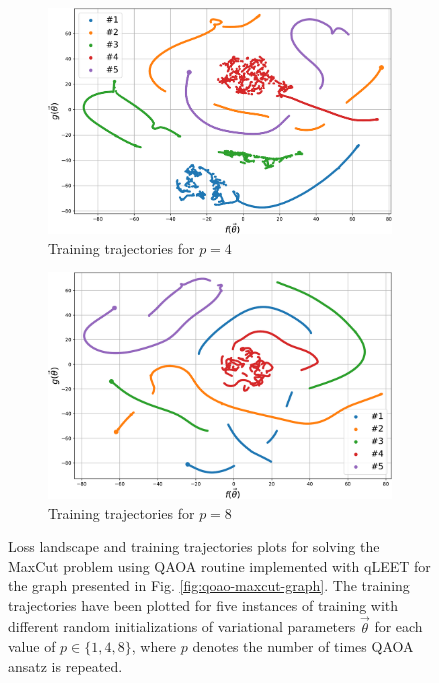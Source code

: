 \begin{figure}[htp]
\begin{subfigure}[b]{0.32\linewidth}
        \includegraphics[width=\textwidth]{figures/qleet/training_trajectory_p2.pdf}
        \caption{Training trajectories for $p=4$\label{fig:train-p4}}
    \end{subfigure}
    \begin{subfigure}[b]{0.32\linewidth}
        \includegraphics[width=\textwidth]{figures/qleet/training_trajectory_p3.pdf}
        \caption{Training trajectories for $p=8$\label{fig:train-p8}}
    \end{subfigure}%
    \caption{Loss landscape and training trajectories plots for solving the MaxCut problem using QAOA routine implemented with qLEET for the graph presented in Fig. \ref{fig:qoao-maxcut-graph}. The training trajectories have been plotted for five instances of training with different random initializations of variational parameters $\vec{\theta}$ for each value of $p\in\{1, 4, 8\}$, where $p$ denotes the number of times QAOA ansatz is repeated.}
    \label{fig:loss-land-train-traj}
\end{figure}

